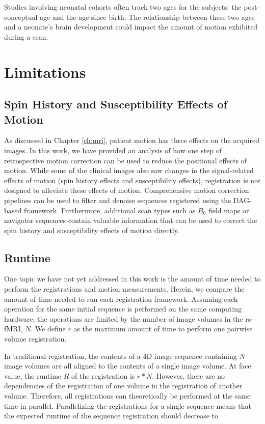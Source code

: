 Studies involving neonatal cohorts often track two ages for the subjects: the post-conceptual age and the age since birth. The relationship between these two ages and a neonate's brain development could impact the amount of motion exhibited during a scan.


\section{Limitations}

\subsection{Spin History and Susceptibility Effects of Motion}

As discussed in Chapter \ref{ch:mri}, patient motion has three effects on the acquired images. In this work, we have provided an analysis of how one step of retrospective motion correction can be used to reduce the positional effects of motion. While some of the clinical images also saw changes in the signal-related effects of motion (spin history effects and susceptibility effects), registration is not designed to alleviate these effects of motion. Comprehensive motion correction pipelines can be used to filter and denoise sequences registered using the DAG-based framework. Furthermore, additional scan types such as $B_0$ field maps or navigator sequences contain valuable information that can be used to correct the spin history and susceptibility effects of motion directly.

\subsection{Runtime}

One topic we have not yet addressed in this work is the amount of time needed to perform the registrations and motion measurements. Herein, we compare the amount of time needed to run each registration framework. Assuming each operation for the same initial sequence is performed on the same computing hardware, the operations are limited by the number of image volumes in the rs-fMRI, $N$. We define $r$ as the maximum amount of time to perform one pairwise volume registration.

In traditional registration, the contents of a 4D image sequence containing $N$ image volumes are all aligned to the contents of a single image volume. At face value, the runtime $R$ of the registration is $r*N$. However, there are no dependencies of the registration of one volume in the registration of another volume. Therefore, all registrations can theoretically be performed at the same time in parallel. Parallelizing the registrations for a single sequence means that the expected runtime of the sequence registration should decrease to 

